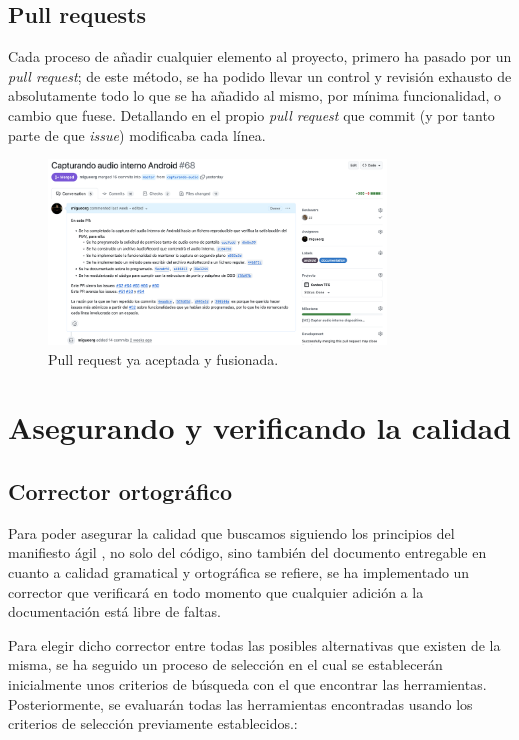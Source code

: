\subsection{Pull requests}

Cada proceso de añadir cualquier elemento al proyecto, primero ha pasado por un
\emph{pull request}; de este método, se ha podido llevar un control y revisión
exhausto de absolutamente todo lo que se ha añadido al mismo, por mínima
funcionalidad, o cambio que fuese. Detallando en el propio \emph{pull request}
que commit (y por tanto parte de que \emph{issue}) modificaba cada línea.

\begin{figure}[H]
    \centering
    \includegraphics[width=0.8\textwidth]{fotos/pull_request.png}
    \caption{Pull request ya aceptada y fusionada.}
\end{figure}


\section{Asegurando y verificando la calidad}

\subsection{Corrector ortográfico}
Para poder asegurar la calidad que buscamos siguiendo los principios del manifiesto
ágil \cite{agile-manifiesto}, no solo del código, sino también del documento
entregable en cuanto a calidad gramatical y ortográfica se refiere, se ha
implementado un corrector que verificará en todo momento que cualquier adición a
la documentación está libre de faltas. 

Para elegir dicho corrector entre todas las posibles alternativas que existen de 
la misma, se ha seguido un proceso de selección en el cual se establecerán 
inicialmente unos criterios de búsqueda con el que encontrar las herramientas. 
Posteriormente, se evaluarán todas las herramientas encontradas usando los 
criterios de selección previamente establecidos.: 

